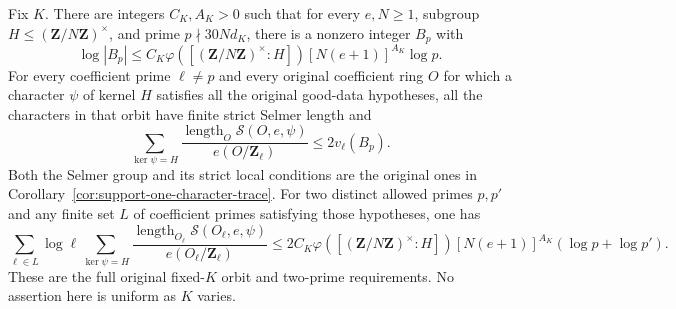 \begin{corollary}
\label{cor:support-spectrum-orbit}
Fix $K$.  There are integers $C_K,A_K>0$ such that for every
$e,N\ge1$, subgroup $H\le(\mathbf Z/N\mathbf Z)^\times$,
and prime $p\nmid30Nd_K$, there is a nonzero integer $B_p$ with
\[
 \log|B_p|\le C_K\varphi([(\mathbf Z/N\mathbf Z)^\times:H])
                      [N(e+1)]^{A_K}\log p.                   \tag{SP18}
\]
For every coefficient prime $\ell\ne p$ and every original
coefficient ring $O$ for which a character $\psi$ of kernel $H$
satisfies all the original good-data hypotheses, all the
characters in that orbit have finite strict Selmer length and
\[
 \sum_{\ker\psi=H}
     \frac{\operatorname{length}_O\mathcal S(O,e,\psi)}
          {e(O/\mathbf Z_\ell)}
                    \le2v_\ell(B_p).                         \tag{SP19}
\]
Both the Selmer group and its strict local conditions are the
original ones in Corollary~\ref{cor:support-one-character-trace}.
For two distinct allowed primes $p,p'$ and any finite set $L$
of coefficient primes satisfying those hypotheses, one has
\[
 \sum_{\ell\in L}\log\ell\sum_{\ker\psi=H}
     \frac{\operatorname{length}_{O_\ell}\mathcal S(O_\ell,e,\psi)}
          {e(O_\ell/\mathbf Z_\ell)}
 \le2C_K\varphi([(\mathbf Z/N\mathbf Z)^\times:H])
          [N(e+1)]^{A_K}(\log p+\log p').                      \tag{SP20}
\]
These are the full original fixed-$K$ orbit and two-prime
requirements.  No assertion here is uniform as $K$ varies.
\end{corollary}

